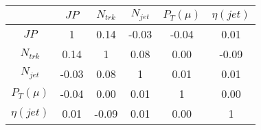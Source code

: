 \begin{tabular}{|c|c|c|c|c|c|} 
\hline
 & $JP$ & $N_{trk}$ & $N_{jet}$ & $P_{T} (\mu)$ & $\eta (jet)$ \\ \hline
$JP$ & 1 & 0.14 & -0.03 & -0.04 & 0.01 \\
$N_{trk}$ & 0.14 & 1 & 0.08 & 0.00 & -0.09 \\
$N_{jet}$ & -0.03 & 0.08 & 1 & 0.01 & 0.01 \\
$P_{T} (\mu)$ & -0.04 & 0.00 & 0.01 & 1 & 0.00 \\
$\eta (jet)$ & 0.01 & -0.09 & 0.01 & 0.00 & 1 \\
\hline 
\end{tabular} 


